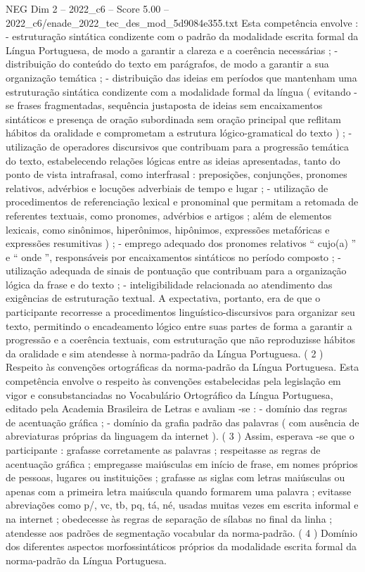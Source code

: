 \begin{textsample}{NEG Dim 2 – 2022\_c6 – Score 5.00 – 2022\_c6/enade\_2022\_tec\_des\_mod\_5d9084e355.txt}
Esta competência envolve : - estruturação sintática condizente com o padrão da modalidade escrita formal da Língua Portuguesa, de modo a garantir a clareza e a coerência necessárias ; - distribuição do conteúdo do texto em parágrafos, de modo a garantir a sua organização temática ; - distribuição das ideias em períodos que mantenham uma estruturação sintática condizente com a modalidade formal da língua ( evitando -se frases fragmentadas, sequência justaposta de ideias sem encaixamentos sintáticos e presença de oração subordinada sem oração principal que reflitam hábitos da oralidade e comprometam a estrutura lógico-gramatical do texto ) ; - utilização de operadores discursivos que contribuam para a progressão temática do texto, estabelecendo relações lógicas entre as ideias apresentadas, tanto do ponto de vista intrafrasal, como interfrasal : preposições, conjunções, pronomes relativos, advérbios e locuções adverbiais de tempo e lugar ; - utilização de procedimentos de referenciação lexical e pronominal que permitam a retomada de referentes textuais, como pronomes, advérbios e artigos ; além de elementos lexicais, como sinônimos, hiperônimos, hipônimos, expressões metafóricas e expressões resumitivas ) ; - emprego adequado dos pronomes relativos “ cujo(a) ” e “ onde ”, responsáveis por encaixamentos sintáticos no período composto ; - utilização adequada de sinais de pontuação que contribuam para a organização lógica da frase e do texto ; - inteligibilidade relacionada ao atendimento das exigências de estruturação textual.
A expectativa, portanto, era de que o participante recorresse a procedimentos linguístico-discursivos para organizar seu texto, permitindo o encadeamento lógico entre suas partes de forma a garantir a progressão e a coerência textuais, com estruturação que não reproduzisse hábitos da oralidade e sim atendesse à norma-padrão da Língua Portuguesa. ( 2 ) Respeito às convenções ortográficas da norma-padrão da Língua Portuguesa.
Esta competência envolve o respeito às convenções estabelecidas pela legislação em vigor e consubstanciadas no Vocabulário Ortográfico da Língua Portuguesa, editado pela Academia Brasileira de Letras e avaliam -se : - domínio das regras de acentuação gráfica ; - domínio da grafia padrão das palavras ( com ausência de abreviaturas próprias da linguagem da internet ). ( 3 ) Assim, esperava -se que o participante : grafasse corretamente as palavras ; respeitasse as regras de acentuação gráfica ; empregasse maiúsculas em início de frase, em nomes próprios de pessoas, lugares ou instituições ; grafasse as siglas com letras maiúsculas ou apenas com a primeira letra maiúscula quando formarem uma palavra ; evitasse abreviações como p/, vc, tb, pq, tá, né, usadas muitas vezes em escrita informal e na internet ; obedecesse às regras de separação de sílabas no final da linha ; atendesse aos padrões de segmentação vocabular da norma-padrão. ( 4 ) Domínio dos diferentes aspectos morfossintáticos próprios da modalidade escrita formal da norma-padrão da Língua Portuguesa.

\end{textsample}
